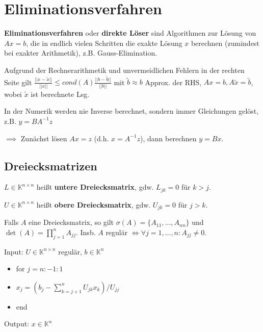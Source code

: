 \section{Eliminationsverfahren}

\textbf{Eliminationsverfahren} oder \textbf{direkte Löser} sind Algorithmen zur Lösung von $Ax=b$, die in endlich vielen Schritten die exakte Lösung $x$ berechnen (zumindest bei exakter Arithmetik), z.B. Gauss-Elimination.

\begin{remark}
	Aufgrund der Rechnerarithmetik und unvermeidlichen Fehlern in der rechten Seite gilt $\frac{||x-\tilde{x}||}{||x||} \leq cond(A) \frac{||b-\tilde{b}||}{||b||}$ mit $\tilde{b} \approx b$ Approx. der RHS, $Ax=b, A\tilde{x} = \tilde{b}$, wobei $\tilde{x}$ ist berechnete Lsg.
\end{remark}

\begin{remark}
	In der Numerik werden nie Inverse berechnet, sondern immer Gleichungen gelöst, z.B. $y = BA^{-1}z$
	
	$\implies$ Zunächst lösen $Ax=z$ (d.h. $x = A^{-1}z$), dann berechnen $y=Bx$.
\end{remark}

\subsection{Dreiecksmatrizen}

\begin{definition}
	$L \in \mathbb{K}^{n\times n}$ heißt \textbf{untere Dreiecksmatrix}, gdw. $L_{jk} = 0$ für $k > j$.
	
	$U \in \mathbb{K}^{n\times n}$ heißt \textbf{obere Dreiecksmatrix}, gdw. $U_{jk} = 0$ für $j > k$.
\end{definition}

\begin{remark}
	Falls $A$ eine Dreiecksmatrix, so gilt $\sigma(A) = \{A_{11}, ..., A_{nn}\}$ und $\det(A)=\prod_{j=1}^{n}A_{jj}$. Insb. $A$ regulär $\iff \forall j=1, ..., n: A_{jj} \neq 0$.
\end{remark}

\begin{algorithm}
	Input: $U \in \mathbb{K}^{n\times n}$ regulär, $b \in \mathbb{K}^n$
	\begin{itemize}
		\item for $j=n:-1:1$
		\item \hspace{0.5cm} $x_j = \left(b_j - \sum_{k=j+1}^{n} U_{jk} x_k\right)/U_{jj}$
		\item end
	\end{itemize}
	Output: $x \in \mathbb{K}^n$
\end{algorithm}


